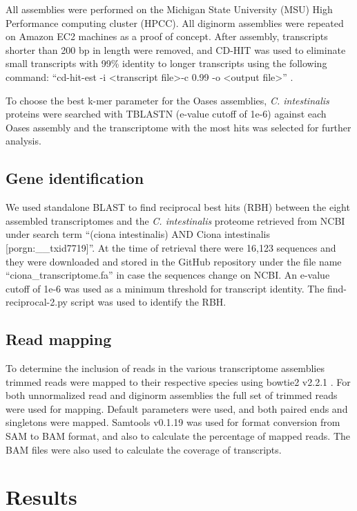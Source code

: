 All assemblies were performed on the Michigan State University (MSU) High Performance computing cluster (HPCC).  All diginorm assemblies were repeated on Amazon EC2 machines as a proof of concept.
After assembly, transcripts shorter than 200 bp in length were removed, and CD-HIT was used to eliminate small transcripts with 99\% identity to longer transcripts using the following command: ``cd-hit-est -i \textless transcript file\textgreater -c 0.99 -o \textless output file\textgreater'' \citep{li_cd-hit:_2006}.

To choose the best k-mer parameter for the Oases assemblies, \textit{C. intestinalis} proteins were searched with TBLASTN (e-value cutoff of 1e-6) against each Oases assembly and the transcriptome with the most hits was selected for further analysis.
\subsection{Gene identification}
We used standalone BLAST to find reciprocal best hits (RBH) between the eight assembled transcriptomes and the \textit{C. intestinalis} proteome retrieved from NCBI under search term ``(ciona intestinalis) AND Ciona intestinalis [porgn:\_\_txid7719]''. At the time of retrieval there were 16,123 sequences and they were downloaded and stored in the GitHub repository under the file name ``ciona\_transcriptome.fa'' in case the sequences change on NCBI. An e-value cutoff of 1e-6 was used as a minimum threshold for transcript identity.  The find-reciprocal-2.py script was used to identify the RBH.
\subsection{Read mapping}
	To determine the inclusion of reads in the various transcriptome assemblies trimmed reads were mapped to their respective species using bowtie2 v2.2.1 \citep{langmead_fast_2012}. For both unnormalized read and diginorm assemblies the full set of trimmed reads were used for mapping. Default parameters were used, and both paired ends and singletons were mapped. Samtools v0.1.19 \citep{li_sequence_2009} was used for format conversion from SAM to BAM format, and also to calculate the percentage of mapped reads. The BAM files were also used to calculate the coverage of transcripts.

\section{Results}

